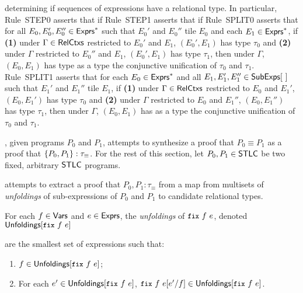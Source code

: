 determining if sequences of expressions have
a relational type.
%
In particular, Rule~STEP0 asserts that if 
%
Rule~STEP1 asserts that if
%
Rule~SPLIT0 asserts that for all $E_0, E_0', E_0'' \in \mathsf{Exprs}^{*}$ such
that $E_0'$ and $E_0''$ tile $E_0$ and %
each $E_1 \in \mathsf{Exprs}^{*}$, if %
\textbf{(1)} under $\Gamma \in \mathsf{RelCtxs}$ restricted to $E_0'$ and
$E_1$, $(E_0', E_1)$ has type $\tau_0$ and %
\textbf{(2)} under $\Gamma$ restricted to $E_0''$ and $E_1$, $(E_0',
E_1)$ has type $\tau_1$, then under $\Gamma$, $(E_0, E_1)$ has type
as a type the conjunctive unification
%
%
of $\tau_0$ and $\tau_1$.
Rule~SPLIT1 asserts that for each $E_0 \in \mathsf{Exprs}^{*}$ and %
all $E_1, E_1', E_1'' \in \subexps$ such that $E_1'$ and $E_1''$ tile
$E_1$, if %
\textbf{(1)} under $\Gamma \in \mathsf{RelCtxs}$ restricted to $E_0$ and
$E_1'$, $(E_0, E_1')$ has type $\tau_0$ and %
\textbf{(2)} under $\Gamma$ restricted to $E_0$ and $E_1''$, $(E_0,
E_1'')$ has type $\tau_1$, then under $\Gamma$, $(E_0, E_1)$ has as a
type the conjunctive unification
%
%
of $\tau_0$ and $\tau_1$.

% 
\sys, given programs $P_0$ and $P_1$, attempts to synthesize a proof
that $P_0 \equiv P_1$ as a proof that $\{  P_0, P_1  \} :
\tau_{\equiv}$.
%
For the rest of this section, let $P_0, P_1 \in \mathsf{STLC}$ be two fixed,
arbitrary $\mathsf{STLC}$ programs.

\sys attempts to extract a proof that $P_0, P_1 : \tau_{\equiv}$ from
a map from multisets of \emph{unfoldings} of sub-expressions of $P_0$
and $P_1$ to candidate relational types.
%
\begin{defn}
  \label{defn:unfoldings}
  For each $f \in \mathsf{Vars}$ and $e \in \mathsf{Exprs}$, the \emph{unfoldings} of
  $\fix{f}{e}$, denoted $\unfoldings{ \fix{f}{e} }$

 are the smallest set of expressions such that:
  \begin{enumerate}
  \item $f \in \unfoldings{ \fix{f}{e} }$;
  \item For each $e' \in \unfoldings{ \fix{f}{e} }$, $\replace{
      \fix{f}{e} }{ f }{ e' } \in \unfoldings{ \fix{f}{e} }$.
  \end{enumerate}
\end{defn}
%
%

